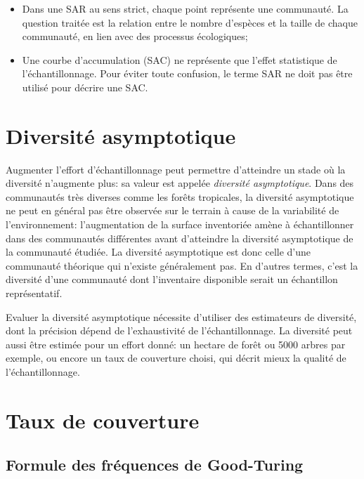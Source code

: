 \documentclass[
  11pt,
  french,
  a4paper,
  extrafontsizes,onecolumn,openright
  ]{memoir}
\providecommand{\tightlist}{%
  \setlength{\itemsep}{0pt}\setlength{\parskip}{0pt}}
\newlength{\rf}
\begin{document}
\begin{itemize}
\tightlist
\item
  Dans une SAR au sens strict, chaque point représente une communauté.
  La question traitée est la relation entre le nombre d'espèces et la taille de chaque communauté, en lien avec des processus écologiques;
\item
  Une courbe d'accumulation (SAC) ne représente que l'effet statistique de l'échantillonnage.
  Pour éviter toute confusion, le terme SAR ne doit pas être utilisé pour décrire une SAC.
\end{itemize}

\section{Diversité asymptotique}\label{diversituxe9-asymptotique}

Augmenter l'effort d'échantillonnage peut permettre d'atteindre un stade où la diversité n'augmente plus: sa valeur est appelée \emph{diversité asymptotique}.
Dans des communautés très diverses comme les forêts tropicales, la diversité asymptotique ne peut en général pas être observée sur le terrain à cause de la variabilité de l'environnement: l'augmentation de la surface inventoriée amène à échantillonner dans des communautés différentes avant d'atteindre la diversité asymptotique de la communauté étudiée.
La diversité asymptotique est donc celle d'une communauté théorique qui n'existe généralement pas.
En d'autres termes, c'est la diversité d'une communauté dont l'inventaire disponible serait un échantillon représentatif.

Evaluer la diversité asymptotique nécessite d'utiliser des estimateurs de diversité, dont la précision dépend de l'exhaustivité de l'échantillonnage.
La diversité peut aussi être estimée pour un effort donné: un hectare de forêt ou 5000 arbres par exemple, ou encore un taux de couverture choisi, qui décrit mieux la qualité de l'échantillonnage.

\section{Taux de couverture}\label{sec-Couverture}

\subsection{Formule des fréquences de Good-Turing}\label{formule-des-fruxe9quences-de-good-turing}
\end{document}
